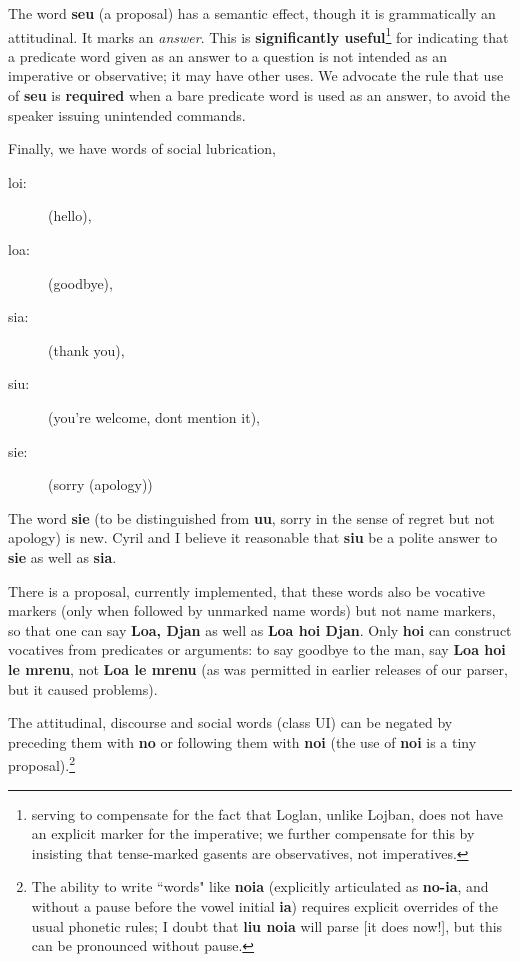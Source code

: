 \documentclass[12pt]{book}
\begin{document}
{The word {\bf seu} (a proposal) has a semantic effect, though it is grammatically an attitudinal.  It marks an {\em answer\/}.  This
is {\bf significantly useful}\footnote{serving to compensate for the fact that Loglan, unlike Lojban, does not have an explicit marker for the imperative; we further compensate for this by insisting that tense-marked gasents are observatives, not imperatives.} for indicating that a predicate word given as an answer to a question is not intended as an imperative or observative; it may have other uses.  We advocate the rule that use of {\bf seu} is {\bf required\/} when a bare predicate word is used as an answer, to avoid the speaker issuing unintended commands.

Finally, we have words of social lubrication, 

\begin{description}
\item[loi:]  (hello),

\item[loa:]  (goodbye), 

\item[sia:]  (thank you), 

\item[siu:]   (you're welcome, dont mention it),

\item[sie:]  (sorry (apology))

\end{description}

The word {\bf sie} (to be distinguished from {\bf uu}, sorry in the sense of regret but not apology) is new.   Cyril and I believe it reasonable that {\bf siu} be a polite answer to {\bf sie} as well as {\bf sia}.   

There is a proposal, currently implemented, that these words also be vocative markers (only when followed by unmarked name words) but not name markers, so that one can say {\bf Loa, Djan} as well as {\bf Loa hoi Djan}.   Only {\bf hoi} can construct vocatives from predicates or arguments:  to say goodbye to the man, say {\bf Loa hoi le mrenu}, not {\bf Loa le mrenu} (as was permitted in earlier releases of our parser, but it caused problems).

The attitudinal, discourse and social words (class UI) can be negated by preceding them with {\bf no} or following them with {\bf noi} (the use of {\bf noi} is a tiny proposal).\footnote{The ability to write ``words" like {\bf noia} (explicitly articulated as {\bf no-ia}, and without a pause before the vowel initial {\bf ia})  requires explicit overrides of the usual phonetic rules; I doubt that {\bf liu noia} will parse [it does now!], but this can be pronounced without pause.}

}
\end{document}
